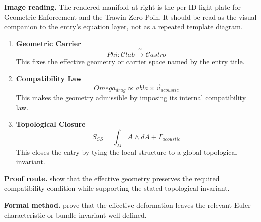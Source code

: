 \begin{samepage}
\noindent\begin{minipage}[t]{0.45\linewidth}
\vspace{0pt}
\raggedright
\scriptsize\textbf{Image reading.} The rendered manifold at right is the per-ID light plate for Geometric Enforcement and the Trawin Zero Poin. It should be read as the visual companion to the entry's equation layer, not as a repeated template diagram.\par
\end{minipage}\hfill
\begin{minipage}[t]{0.53\linewidth}
\vspace*{-0.10in}
\raggedright
{}
\end{minipage}
\end{samepage}

\clearpage


\begin{enumerate}[leftmargin=1.6em,itemsep=9pt,topsep=6pt]
\item \textbf{Geometric Carrier}
\[
Phi: \mathcal{C} {lab} \xrightarrow{\cong} \mathcal{C} {astro}
\]
This fixes the effective geometry or carrier space named by the entry title.

\item \textbf{Compatibility Law}
\[
Omega_{drag} \propto  abla \times \vec{v}_{acoustic}
\]
This makes the geometry admissible by imposing its internal compatibility law.

\item \textbf{Topological Closure}
\[
S_{CS} = \int_{M} A \wedge dA + \Gamma_{acoustic}
\]
This closes the entry by tying the local structure to a global topological invariant.
\end{enumerate}

\textbf{Proof route.} show that the effective geometry preserves the required compatibility condition while supporting the stated topological invariant.

\textbf{Formal method.} prove that the effective deformation leaves the relevant Euler characteristic or bundle invariant well-defined.

\medskip
{}

